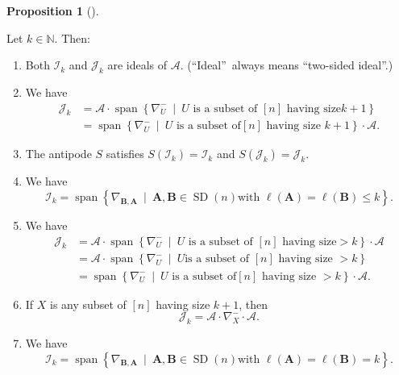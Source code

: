 \documentclass[numbers=enddot,12pt,final,onecolumn,notitlepage]{scrartcl}%
\numberwithin{exer}{subsection}
\theoremstyle{definition}
\newtheorem{prop}[theo]{Proposition}
\newenvironment{proposition}[1][]
{\begin{prop}[#1]\begin{leftbar}}
{\end{leftbar}\end{prop}}
\begin{document}
\begin{proposition}
\label{prop.IJ.1}Let $k\in\mathbb{N}$. Then:

\begin{enumerate}
\item[\textbf{(a)}] Both $\mathcal{I}_{k}$ and $\mathcal{J}_{k}$ are ideals of
$\mathcal{A}$. (\textquotedblleft Ideal\textquotedblright\ always means
\textquotedblleft two-sided ideal\textquotedblright.)

\item[\textbf{(b)}] We have%
\begin{align*}
\mathcal{J}_{k}  &  =\mathcal{A}\cdot\operatorname*{span}\left\{  \nabla
_{U}^{-}\ \mid\ U\text{ is a subset of }\left[  n\right]  \text{ having size
}k+1\right\} \\
&  =\operatorname*{span}\left\{  \nabla_{U}^{-}\ \mid\ U\text{ is a subset of
}\left[  n\right]  \text{ having size }k+1\right\}  \cdot\mathcal{A}.
\end{align*}


\item[\textbf{(c)}] The antipode $S$ satisfies $S\left(  \mathcal{I}%
_{k}\right)  =\mathcal{I}_{k}$ and $S\left(  \mathcal{J}_{k}\right)
=\mathcal{J}_{k}$.

\item[\textbf{(d)}] We have
\[
\mathcal{I}_{k}=\operatorname*{span}\left\{  \nabla_{\mathbf{B},\mathbf{A}%
}\ \mid\ \mathbf{A},\mathbf{B}\in\operatorname*{SD}\left(  n\right)  \text{
with }\ell\left(  \mathbf{A}\right)  =\ell\left(  \mathbf{B}\right)  \leq
k\right\}  .
\]


\item[\textbf{(e)}] We have
\begin{align*}
\mathcal{J}_{k}  &  =\mathcal{A}\cdot\operatorname*{span}\left\{  \nabla
_{U}^{-}\ \mid\ U\text{ is a subset of }\left[  n\right]  \text{ having size
}>k\right\}  \cdot\mathcal{A}\\
&  =\mathcal{A}\cdot\operatorname*{span}\left\{  \nabla_{U}^{-}\ \mid\ U\text{
is a subset of }\left[  n\right]  \text{ having size }>k\right\} \\
&  =\operatorname*{span}\left\{  \nabla_{U}^{-}\ \mid\ U\text{ is a subset of
}\left[  n\right]  \text{ having size }>k\right\}  \cdot\mathcal{A}.
\end{align*}


\item[\textbf{(f)}] If $X$ is any subset of $\left[  n\right]  $ having size
$k+1$, then%
\[
\mathcal{J}_{k}=\mathcal{A}\cdot\nabla_{X}^{-}\cdot\mathcal{A}.
\]


\item[\textbf{(g)}] We have%
\[
\mathcal{I}_{k}=\operatorname*{span}\left\{  \nabla_{\mathbf{B},\mathbf{A}%
}\ \mid\ \mathbf{A},\mathbf{B}\in\operatorname*{SD}\left(  n\right)  \text{
with }\ell\left(  \mathbf{A}\right)  =\ell\left(  \mathbf{B}\right)
=k\right\}  .
\]

\end{enumerate}
\end{proposition}
\end{document}

